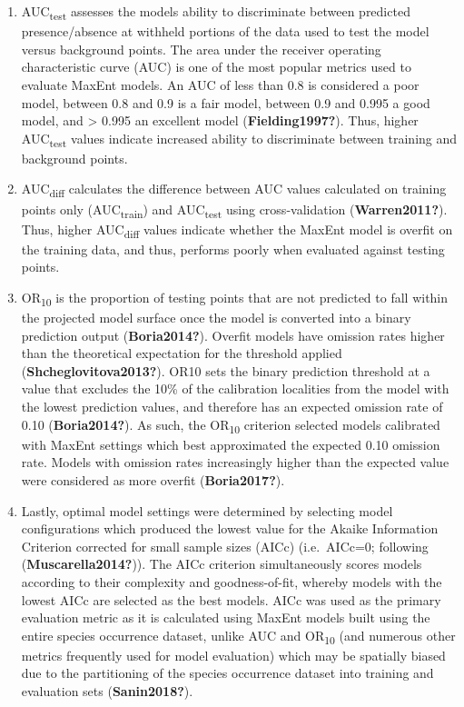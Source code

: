 \documentclass[12pt,]{article}
\begin{document}
\begin{enumerate}
\def\labelenumi{(\arabic{enumi})}
\item
  AUC\textsubscript{test} assesses the models ability to discriminate
  between predicted presence/absence at withheld portions of the data
  used to test the model versus background points. The area under the
  receiver operating characteristic curve (AUC) is one of the most
  popular metrics used to evaluate MaxEnt models. An AUC of less than
  0.8 is considered a poor model, between 0.8 and 0.9 is a fair model,
  between 0.9 and 0.995 a good model, and \textgreater{} 0.995 an
  excellent model (\textbf{Fielding1997?}). Thus, higher
  AUC\textsubscript{test} values indicate increased ability to
  discriminate between training and background points.
\item
  AUC\textsubscript{diff} calculates the difference between AUC values
  calculated on training points only (AUC\textsubscript{train}) and
  AUC\textsubscript{test} using cross-validation (\textbf{Warren2011?}).
  Thus, higher AUC\textsubscript{diff} values indicate whether the
  MaxEnt model is overfit on the training data, and thus, performs
  poorly when evaluated against testing points.
\item
  OR\textsubscript{10} is the proportion of testing points that are not
  predicted to fall within the projected model surface once the model is
  converted into a binary prediction output (\textbf{Boria2014?}).
  Overfit models have omission rates higher than the theoretical
  expectation for the threshold applied (\textbf{Shcheglovitova2013?}).
  OR10 sets the binary prediction threshold at a value that excludes the
  10\% of the calibration localities from the model with the lowest
  prediction values, and therefore has an expected omission rate of 0.10
  (\textbf{Boria2014?}). As such, the OR\textsubscript{10} criterion
  selected models calibrated with MaxEnt settings which best
  approximated the expected 0.10 omission rate. Models with omission
  rates increasingly higher than the expected value were considered as
  more overfit (\textbf{Boria2017?}).
\item
  Lastly, optimal model settings were determined by selecting model
  configurations which produced the lowest value for the Akaike
  Information Criterion corrected for small sample sizes (AICc)
  (i.e.~AICc=0; following (\textbf{Muscarella2014?})). The AICc
  criterion simultaneously scores models according to their complexity
  and goodness-of-fit, whereby models with the lowest AICc are selected
  as the best models. AICc was used as the primary evaluation metric as
  it is calculated using MaxEnt models built using the entire species
  occurrence dataset, unlike AUC and OR\textsubscript{10} (and numerous
  other metrics frequently used for model evaluation) which may be
  spatially biased due to the partitioning of the species occurrence
  dataset into training and evaluation sets (\textbf{Sanin2018?}).
\end{enumerate}
\end{document}

